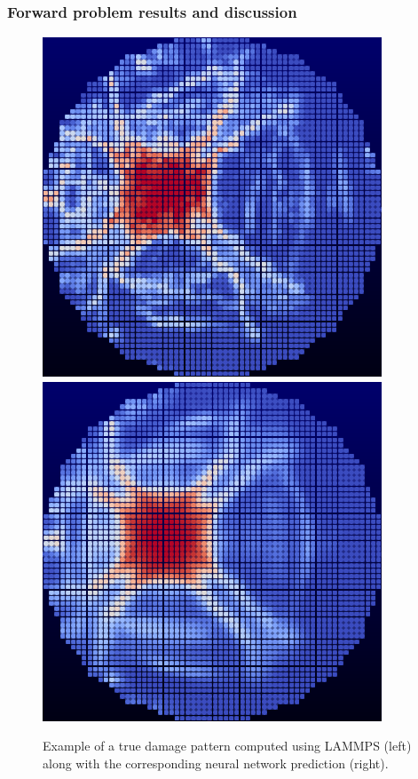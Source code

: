 \subsubsection{Forward problem results and discussion}
\label{forward_results}

\begin{figure}
  \centering
  \includegraphics[scale=1.1]{figure/New_Solutions/soln_19050.eps}
  \includegraphics[scale=1.1]{figure/New_Solutions/pred_19050.eps}
\caption{Example of a true damage pattern computed using LAMMPS (left) along with the corresponding neural network prediction (right).}
\label{fig:forward_results}       
\end{figure}


